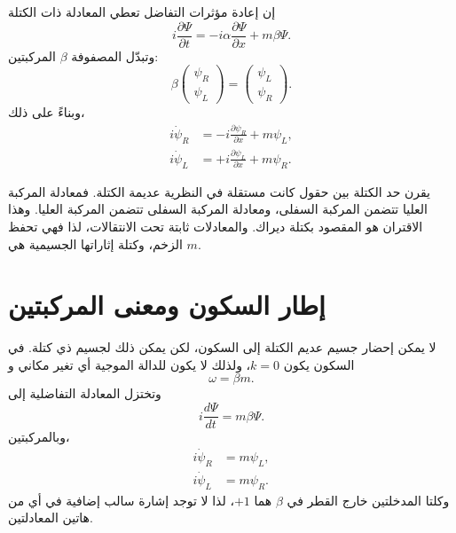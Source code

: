 إن إعادة مؤثرات التفاضل تعطي المعادلة ذات الكتلة
\begin{equation}
i\frac{\partial\Psi}{\partial t}
=
-i\alpha\frac{\partial\Psi}{\partial x}
+m\beta\Psi.
\end{equation}
وتبدّل المصفوفة \(\beta\) المركبتين:
\begin{equation}
\beta
\begin{pmatrix}
\psi_R\\
\psi_L
\end{pmatrix}
=
\begin{pmatrix}
\psi_L\\
\psi_R
\end{pmatrix}.
\end{equation}
وبناءً على ذلك،
\begin{align}
i\dot{\psi}_R
&=-i\frac{\partial\psi_R}{\partial x}+m\psi_L,\\
i\dot{\psi}_L
&=+i\frac{\partial\psi_L}{\partial x}+m\psi_R.
\end{align}

يقرن حد الكتلة بين حقول كانت مستقلة في النظرية عديمة الكتلة. فمعادلة المركبة العليا تتضمن المركبة السفلى، ومعادلة المركبة السفلى تتضمن المركبة العليا. وهذا الاقتران هو المقصود بكتلة ديراك. والمعادلات ثابتة تحت الانتقالات، لذا فهي تحفظ الزخم، وكتلة إثاراتها الجسيمية هي \(m\).

\begin{classroomqa}
\end{classroomqa}

\section{إطار السكون ومعنى المركبتين}

لا يمكن إحضار جسيم عديم الكتلة إلى السكون، لكن يمكن ذلك لجسيم ذي كتلة. في السكون يكون \(k=0\)، ولذلك لا يكون للدالة الموجية أي تغير مكاني و
\begin{equation}
\omega=\beta m.
\end{equation}
وتختزل المعادلة التفاضلية إلى
\begin{equation}
i\frac{d\Psi}{dt}=m\beta\Psi.
\end{equation}
وبالمركبتين،
\begin{align}
i\dot{\psi}_R&=m\psi_L,\\
i\dot{\psi}_L&=m\psi_R.
\end{align}
وكلتا المدخلتين خارج القطر في \(\beta\) هما \(+1\)، لذا لا توجد إشارة سالب إضافية في أي من هاتين المعادلتين.

